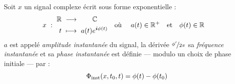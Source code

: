 \begin{definition} \label{def:param_instant}
	Soit $x$ un signal complexe écrit sous forme exponentielle :
	\begin{align}
		x\ &:\ \begin{aligned}\mathbb{R}\ &\longrightarrow\qquad \mathbb{C} \\
			t\ &\longmapsto\ a(t)e^{\boldsymbol{i} \phi(t)}
		\end{aligned}  &  \text{où }\quad a(t)\in\mathbb{R}^+\quad &\text{et}\quad \phi(t)\in\mathbb{R}
	\end{align}
	$a$ est appelé \emph{amplitude instantanée} du signal, la dérivée $\nicefrac{\phi'}{2\pi}$ sa \emph{fréquence instantanée} et sa \emph{phase instantanée} est définie --- modulo un choix de phase initiale --- par :
	\begin{equation} \label{eq:phasei}
		\Phi_{\text{\normalfont inst}}(x,t_0,t) = \phi(t) - \phi(t_0)
	\end{equation}
\end{definition}
\skipl 

